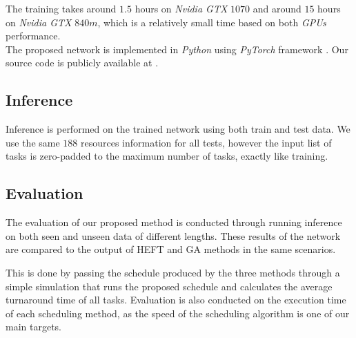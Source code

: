 The training takes around $1.5$ hours on \emph{Nvidia GTX} $1070$ and around $15$ hours on \emph{Nvidia GTX} $840m$, which is a relatively small time based on both \emph{GPUs} performance. \\

The proposed network is implemented in \emph{Python} using \emph{PyTorch} framework \cite{paszke2019pytorch}.  Our source code is publicly available at .

\subsection{Inference}
Inference is performed on the trained network using both train and test data. We use the same $188$ resources information for all tests, however the input list of tasks is zero-padded to the maximum number of tasks, exactly like training.

\subsection{Evaluation}
The evaluation of our proposed method is conducted through running inference on both seen and unseen data of different lengths. These results of the network are compared to the output of HEFT and GA methods in the same scenarios. 

This is done by passing the schedule produced by the three methods through a simple simulation that runs the proposed schedule and calculates the average turnaround time of all tasks. Evaluation is also conducted on the execution time of each scheduling method, as the speed of the scheduling algorithm is one of our main targets.

